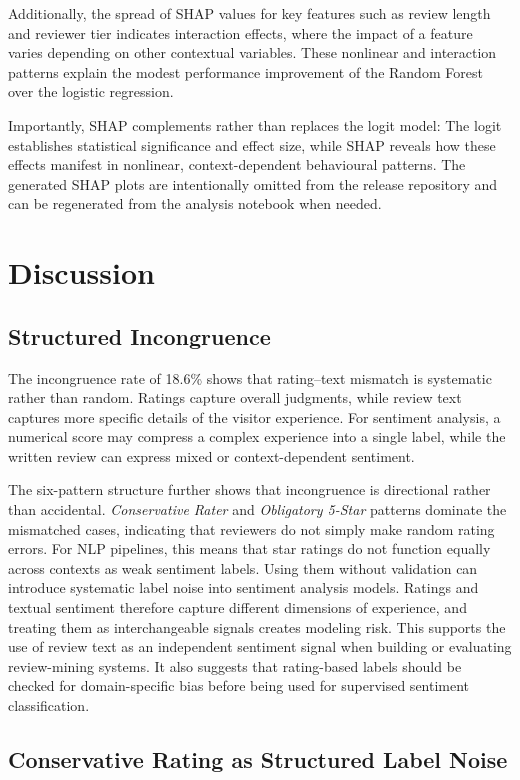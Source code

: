 \documentclass[conference]{IEEEtran}
\begin{document}
Additionally, the spread of SHAP values for key features such as review length and reviewer tier indicates interaction effects, where the impact of a feature varies depending on other contextual variables. These nonlinear and interaction patterns explain the modest performance improvement of the Random Forest over the logistic regression.

Importantly, SHAP complements rather than replaces the logit model: The logit establishes statistical significance and effect size, while SHAP reveals how these effects manifest in nonlinear, context-dependent behavioural patterns. The generated SHAP plots are intentionally omitted from the release repository and can be regenerated from the analysis notebook when needed.

\section{Discussion}
\subsection{Structured Incongruence}

The incongruence rate of 18.6\% shows that rating--text mismatch is systematic rather than random. Ratings capture overall judgments, while review text captures more specific details of the visitor experience. For sentiment analysis, a numerical score may compress a complex experience into a single label, while the written review can express mixed or context-dependent sentiment.

The six-pattern structure further shows that incongruence is directional rather than accidental. \textit{Conservative Rater} and \textit{Obligatory 5-Star} patterns dominate the mismatched cases, indicating that reviewers do not simply make random rating errors. For NLP pipelines, this means that star ratings do not function equally across contexts as weak sentiment labels. Using them without validation can introduce systematic label noise into sentiment analysis models. Ratings and textual sentiment therefore capture different dimensions of experience, and treating them as interchangeable signals creates modeling risk. This supports the use of review text as an independent sentiment signal when building or evaluating review-mining systems. It also suggests that rating-based labels should be checked for domain-specific bias before being used for supervised sentiment classification.

\subsection{Conservative Rating as Structured Label Noise}
\end{document}
